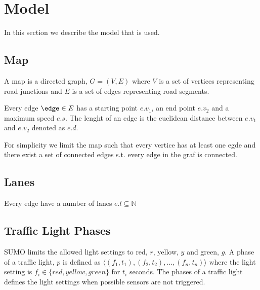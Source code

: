 \section{Model}
In this section we describe the model that is used.

\begin{comment}\\\\
\noindent\begin{tabular}{ll}
$\Sigma$ & alphabet\\
$\mathbb{R}$ & set of real numbers\\
$\mathbb{N}$ & set of natual numbers not including zero\\
$\mathbb{N}_0$ & set of natual numbers including zero
\end{tabular}
\end{comment}

\subsection{Map}
A map is a directed graph, $G = (V, E)$ where $V$ is a set of vertices representing road junctions and $E$ is a set of edges representing road segments.

Every edge $\edge\in E$ has a starting point $e.v_1$, an end point $e.v_2$ and a maximum speed $e.s$. The lenght of an edge is the euclidean distance between $e.v_1$ and $e.v_2$ denoted as $e.d$.

For simplicity we limit the map such that every vertice has at least one egde
and there exist a set of connected edges s.t. every edge in the graf is connected.%

\subsection{Lanes}
Every edge have a number of lanes $e.l \subseteq \mathbb{N} $


\subsection{Traffic Light Phases}
SUMO limits the allowed light settings to red, $r$, yellow, $y$ and green, $g$.
A phase of a traffic light, $p$ is defined as $\langle(f_1, t_1),(f_2, t_2),\dots, (f_n, t_n) \rangle$ where the light setting is $f_i\in \{red, yellow, green\}$ for $t_i$ seconds.
The phases of a traffic light defines the light settings when possible sensors are not triggered.

